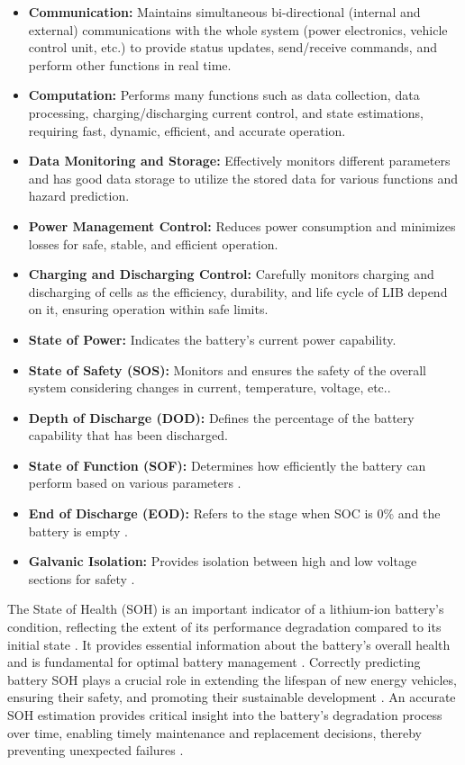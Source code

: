 \begin{itemize}
    \item \textbf{Communication:} Maintains simultaneous bi-directional (internal and external) communications with the whole system (power electronics, vehicle control unit, etc.) to provide status updates, send/receive commands, and perform other functions in real time\cite{wevj-12-00120-v2}. 
    \item \textbf{Computation:} Performs many functions such as data collection, data processing, charging/discharging current control, and state estimations, requiring fast, dynamic, efficient, and accurate operation\cite{wevj-12-00120-v2}.
    \item \textbf{Data Monitoring and Storage:} Effectively monitors different parameters and has good data storage to utilize the stored data for various functions and hazard prediction\cite{wevj-12-00120-v2}.
    \item \textbf{Power Management Control:} Reduces power consumption and minimizes losses for safe, stable, and efficient operation\cite{wevj-12-00120-v2}.
    \item \textbf{Charging and Discharging Control:} Carefully monitors charging and discharging of cells as the efficiency, durability, and life cycle of LIB depend on it, ensuring operation within safe limits\cite{wevj-12-00120-v2}.
    \item \textbf{State of Power:}\cite{wevj-12-00120-v2} Indicates the battery's current power capability.
    \item \textbf{State of Safety (SOS):} Monitors and ensures the safety of the overall system considering changes in current, temperature, voltage, etc.\cite{wevj-12-00120-v2}.
    \item \textbf{Depth of Discharge (DOD):} Defines the percentage of the battery capability that has been discharged\cite{wevj-12-00120-v2}.
    \item \textbf{State of Function (SOF):} Determines how efficiently the battery can perform based on various parameters \cite{wevj-12-00120-v2}.
    \item \textbf{End of Discharge (EOD):} Refers to the stage when SOC is 0\% and the battery is empty \cite{wevj-12-00120-v2}.
    \item \textbf{Galvanic Isolation:} Provides isolation between high and low voltage sections for safety \cite{wevj-12-00120-v2}. 
\end{itemize}

The State of Health (SOH) is an important indicator of a lithium-ion battery's condition, reflecting the extent of its performance degradation compared to its initial state \cite{s41598-025-92262-8}. It provides essential information about the battery's overall health and is fundamental for optimal battery management \cite{105207_1_5.0172683}. Correctly predicting battery SOH plays a crucial role in extending the lifespan of new energy vehicles, ensuring their safety, and promoting their sustainable development \cite{electronics-13-01675}. An accurate SOH estimation provides critical insight into the battery's degradation process over time, enabling timely maintenance and replacement decisions, thereby preventing unexpected failures \cite{105207_1_5.0172683}.


